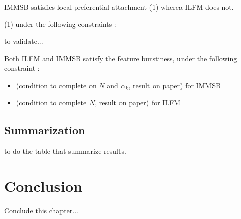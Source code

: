 \begin{proposition}\label{th:ldegree_mg}
    IMMSB satisfies local preferential attachment (1) wherea ILFM does not.

    (1) under the following constraints :

    to validate...
    
\end{proposition}

\begin{proposition}\label{th:feature_mg}
    Both ILFM and IMMSB satisfy the feature burstiness, under the following constraint :
    \begin{itemize}
        \item (condition to complete on $N$ and $\alpha_k$, result on paper) for IMMSB
        \item (condition to complete $N$, result on paper) for ILFM
    \end{itemize}
\item 
\end{proposition}


\subsection{Summarization}

to do the table that summarize results.




\section{Conclusion}

Conclude  this chapter...
